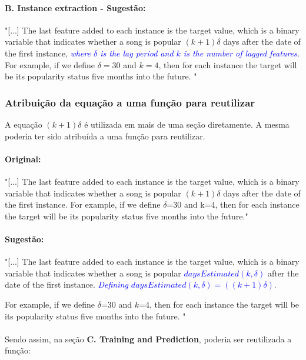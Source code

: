 \documentclass{article}
\begin{document}
\paragraph{B. Instance extraction - Sugestão: }
"[...] The last feature added to each instance is the target value,
which is a binary variable that indicates whether a song is
popular \((k + 1)\delta\) days after the date of the first instance, \textcolor{blue} {\textit{where \(\delta\) is the lag period and \(k\) is the number of lagged features. }}
For
example, if we define \(\delta=30\) and \(k=4\), then for each instance
the target will be its popularity status five months into the
future.
"

\subsubsection{Atribuição da equação a uma função para reutilizar}

A equação \((k + 1)\delta\) é utilizada em mais de uma seção diretamente. A mesma poderia ter sido atribuída a uma função para reutilizar.

\paragraph{Original: }
"[...] The last feature added to each instance is the target value,
which is a binary variable that indicates whether a song is
popular \((k + 1)\delta\) days after the date of the first instance. For example, if we define \(\delta\)=30 and k=4, then for each instance
the target will be its popularity status five months into the
future."

\paragraph{Sugestão: }
"[...] The last feature added to each instance is the target value,
which is a binary variable that indicates whether a song is
popular \textcolor{blue} {\textit{ \( daysEstimated(k, \delta)\) }} after the date of the first instance.\textcolor{blue} {\textit{ Defining \( daysEstimated(k, \delta) = ((k + 1)\delta) \)}}.

For
example, if we define \(\delta\)=30 and \(k\)=4, then for each instance
the target will be its popularity status five months into the
future.
"
\\
\\
Sendo assim, na seção \textbf{C. Training and Prediction}, poderia ser reutilizada a função:
\end{document}
